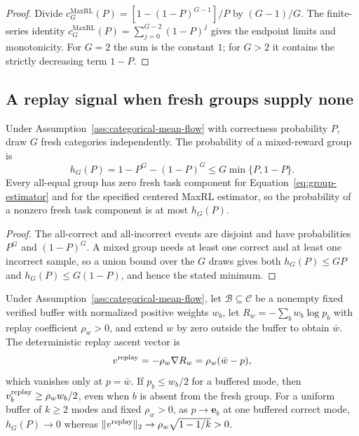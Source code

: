 \begin{proof}
\enforcehalffinalproseline
Divide $c_G^{\mathrm{MaxRL}}(P)=[1-(1-P)^{G-1}]/P$ by $(G-1)/G$.
The finite-series identity
$c_G^{\mathrm{MaxRL}}(P)=\sum_{j=0}^{G-2}(1-P)^j$
gives the endpoint limits and monotonicity. For $G=2$ the sum is the
constant $1$; for $G>2$ it contains the strictly decreasing term $1-P$.
\end{proof}

\subsection{A replay signal when fresh groups supply none}
\label{app:theory-gradient-availability}

\begin{lemma}
\enforcehalffinalproseline
\label{lem:replay-gradient-availability}
Under Assumption~\ref{ass:categorical-mean-flow} with correctness probability
$P$, draw $G$ fresh categories independently. The probability of a
mixed-reward group is
\[
 h_G(P)=1-P^G-(1-P)^G\le G\min\{P,1-P\}.
\]
Every all-equal group has zero fresh task component for
Equation~\eqref{eq:group-estimator} and for the specified centered MaxRL
estimator, so the probability of a nonzero fresh task component is at most $h_G(P)$.
\end{lemma}

\begin{proof}
\enforcehalffinalproseline
The all-correct and all-incorrect events are disjoint and have probabilities
$P^G$ and $(1-P)^G$. A mixed group needs at least one correct and at least
one incorrect sample, so a union bound over the $G$ draws gives both
$h_G(P)\le GP$ and $h_G(P)\le G(1-P)$, and hence the stated minimum.
\end{proof}

\begin{lemma}
\enforcehalffinalproseline
\label{lem:replay-ascent}
Under Assumption~\ref{ass:categorical-mean-flow}, let
$\mathcal B\subseteq\mathcal C$ be a nonempty fixed verified buffer with
normalized positive weights $w_b$, let $R_w=-\sum_b w_b\log p_b$ with replay
coefficient $\rho_w>0$, and extend $w$ by zero outside the buffer to obtain $\bar w$. The
deterministic replay ascent vector is
\[
 v^{\rm replay}=-\rho_w\nabla R_w=\rho_w(\bar w-p),
\]
which vanishes only at $p=\bar w$. If $p_b\le w_b/2$ for a buffered mode, then
$v^{\rm replay}_b\ge\rho_w w_b/2$, even when $b$ is absent from the fresh
group. For a uniform buffer of $k\ge2$ modes and fixed $\rho_w>0$, as
$p\to\mathbf e_b$ at one buffered correct mode, $h_G(P)\to0$ whereas
$\|v^{\rm replay}\|_2\to\rho_w\sqrt{1-1/k}>0$.
\end{lemma}

